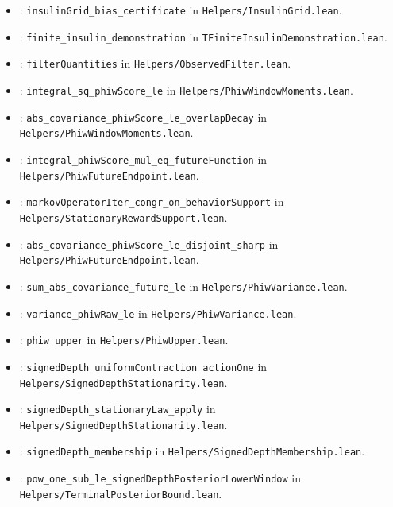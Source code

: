 \begin{itemize}
\item {}: \texttt{insulinGrid\_bias\_certificate} in \texttt{Helpers/InsulinGrid.lean}.
\item {}: \texttt{finite\_insulin\_demonstration} in \texttt{TFiniteInsulinDemonstration.lean}.
\item {}: \texttt{filterQuantities} in \texttt{Helpers/ObservedFilter.lean}.
\item {}: \texttt{integral\_sq\_phiwScore\_le} in \texttt{Helpers/PhiwWindowMoments.lean}.
\item {}: \texttt{abs\_covariance\_phiwScore\_le\_overlapDecay} in \texttt{Helpers/PhiwWindowMoments.lean}.
\item {}: \texttt{integral\_phiwScore\_mul\_eq\_futureFunction} in \texttt{Helpers/PhiwFutureEndpoint.lean}.
\item {}: \texttt{markovOperatorIter\_congr\_on\_behaviorSupport} in \texttt{Helpers/StationaryRewardSupport.lean}.
\item {}: \texttt{abs\_covariance\_phiwScore\_le\_disjoint\_sharp} in \texttt{Helpers/PhiwFutureEndpoint.lean}.
\item {}: \texttt{sum\_abs\_covariance\_future\_le} in \texttt{Helpers/PhiwVariance.lean}.
\item {}: \texttt{variance\_phiwRaw\_le} in \texttt{Helpers/PhiwVariance.lean}.
\item {}: \texttt{phiw\_upper} in \texttt{Helpers/PhiwUpper.lean}.
\item {}: \texttt{signedDepth\_uniformContraction\_actionOne} in \texttt{Helpers/SignedDepthStationarity.lean}.
\item {}: \texttt{signedDepth\_stationaryLaw\_apply} in \texttt{Helpers/SignedDepthStationarity.lean}.
\item {}: \texttt{signedDepth\_membership} in \texttt{Helpers/SignedDepthMembership.lean}.
\item {}: \texttt{pow\_one\_sub\_le\_signedDepthPosteriorLowerWindow} in \texttt{Helpers/TerminalPosteriorBound.lean}.

\end{itemize}
